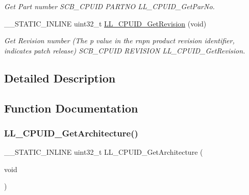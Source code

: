 \begin{DoxyCompactItemize}
\begin{DoxyCompactList}\small\item\em Get Part number  S\+C\+B\+\_\+\+C\+P\+U\+ID P\+A\+R\+T\+NO L\+L\+\_\+\+C\+P\+U\+I\+D\+\_\+\+Get\+Par\+No. \end{DoxyCompactList}\item 
\+\_\+\+\_\+\+S\+T\+A\+T\+I\+C\+\_\+\+I\+N\+L\+I\+NE uint32\+\_\+t \hyperlink{group___c_o_r_t_e_x___l_l___e_f___m_c_u___i_n_f_o_ga7372821defd92c49ea4563da407acd01}{L\+L\+\_\+\+C\+P\+U\+I\+D\+\_\+\+Get\+Revision} (void)
\begin{DoxyCompactList}\small\item\em Get Revision number (The p value in the rnpn product revision identifier, indicates patch release)  S\+C\+B\+\_\+\+C\+P\+U\+ID R\+E\+V\+I\+S\+I\+ON L\+L\+\_\+\+C\+P\+U\+I\+D\+\_\+\+Get\+Revision. \end{DoxyCompactList}\end{DoxyCompactItemize}


\subsection{Detailed Description}


\subsection{Function Documentation}
\mbox{\label{group___c_o_r_t_e_x___l_l___e_f___m_c_u___i_n_f_o_gadc6dc3055d2a192ac1218e09a1e8fd19}} 
\subsubsection{\texorpdfstring{L\+L\+\_\+\+C\+P\+U\+I\+D\+\_\+\+Get\+Architecture()}{LL\_CPUID\_GetArchitecture()}}
{\footnotesize\ttfamily \+\_\+\+\_\+\+S\+T\+A\+T\+I\+C\+\_\+\+I\+N\+L\+I\+NE uint32\+\_\+t L\+L\+\_\+\+C\+P\+U\+I\+D\+\_\+\+Get\+Architecture (\begin{DoxyParamCaption}\item[{void}]{ }\end{DoxyParamCaption})}



